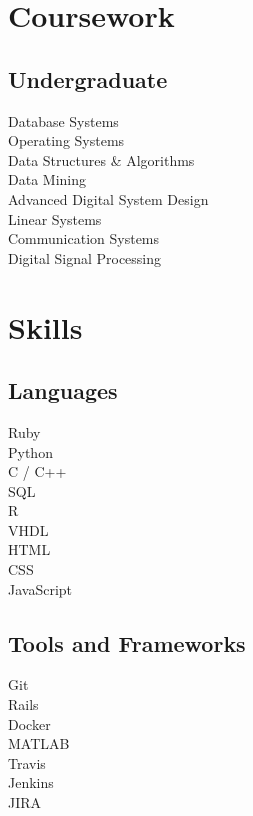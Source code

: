 \documentclass[letterpaper]{deedy-resume} %
\begin{document}
\begin{minipage}[t]{0.33\textwidth}

\section{Coursework}

\subsection{Undergraduate}

Database Systems \\
Operating Systems \\
Data Structures \& Algorithms \\
Data Mining \\
Advanced Digital System Design \\
Linear Systems \\
Communication Systems \\
Digital Signal Processing

\sectionspace %


\section{Skills}

\subsection{Languages}

Ruby \\
Python \\
C / C++ \\
SQL \\
R \\
VHDL \\
HTML \\
CSS \\
JavaScript

\sectionspace %

\subsection{Tools and Frameworks}

Git \\
Rails \\
Docker \\
MATLAB \\
Travis \\
Jenkins \\
JIRA


\end{minipage}
\end{document}
